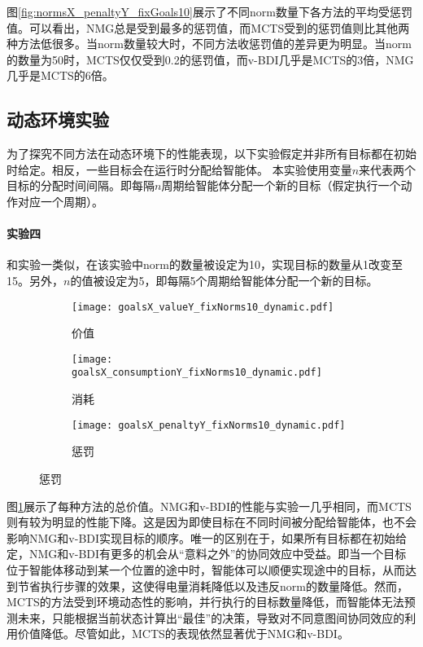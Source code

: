 图\ref{fig:normsX_penaltyY_fixGoals10}展示了不同norm数量下各方法的平均受惩罚值。可以看出，NMG总是受到最多的惩罚值，而MCTS受到的惩罚值则比其他两种方法低很多。当norm数量较大时，不同方法收惩罚值的差异更为明显。当norm的数量为50时，MCTS仅仅受到0.2的惩罚值，而v-BDI几乎是MCTS的3倍，NMG几乎是MCTS的6倍。

\subsection{动态环境实验}
为了探究不同方法在动态环境下的性能表现，以下实验假定并非所有目标都在初始时给定。相反，一些目标会在运行时分配给智能体。
%
本实验使用变量$n$来代表两个目标的分配时间间隔。即每隔$n$周期给智能体分配一个新的目标（假定执行一个动作对应一个周期）。

\paragraph{实验四}
和实验一类似，在该实验中norm的数量被设定为10，实现目标的数量从1改变至15。另外，$n$的值被设定为5，即每隔5个周期给智能体分配一个新的目标。
\begin{figure}
\centering
\begin{subfigure}{.47\textwidth}
  \centering
  \texttt{[image: goalsX\_valueY\_fixNorms10\_dynamic.pdf]}
  \captionsetup{justification=centering}
  \caption{价值}
  \label{fig:goalsX_valueY_fixNorms10_dynamic}
\end{subfigure}

\begin{subfigure}{.47\textwidth}
  \centering
  \texttt{[image: goalsX\_consumptionY\_fixNorms10\_dynamic.pdf]}
  \captionsetup{justification=centering}
  \caption{消耗}
  \label{fig:goalsX_consumptionY_fixNorms10_dynamic}
\end{subfigure}
\begin{subfigure}{.47\textwidth}
  \centering
  \texttt{[image: goalsX\_penaltyY\_fixNorms10\_dynamic.pdf]}
  \captionsetup{justification=centering}
  \caption{惩罚}
  \label{fig:goalsX_penaltyY_fixNorms10_dynamic}
\end{subfigure}
\captionsetup{justification=centering}
\label{fig:all_fixNorms10_dynamic}
\end{figure}

图\ref{fig:goalsX_valueY_fixNorms10_dynamic}展示了每种方法的总价值。NMG和v-BDI的性能与实验一几乎相同，而MCTS则有较为明显的性能下降。这是因为即使目标在不同时间被分配给智能体，也不会影响NMG和v-BDI实现目标的顺序。唯一的区别在于，如果所有目标都在初始给定，NMG和v-BDI有更多的机会从“意料之外”的协同效应中受益。即当一个目标位于智能体移动到某一个位置的途中时，智能体可以顺便实现途中的目标，从而达到节省执行步骤的效果，这使得电量消耗降低以及违反norm的数量降低。然而，MCTS的方法受到环境动态性的影响，并行执行的目标数量降低，而智能体无法预测未来，只能根据当前状态计算出“最佳”的决策，导致对不同意图间协同效应的利用价值降低。尽管如此，MCTS的表现依然显著优于NMG和v-BDI。

